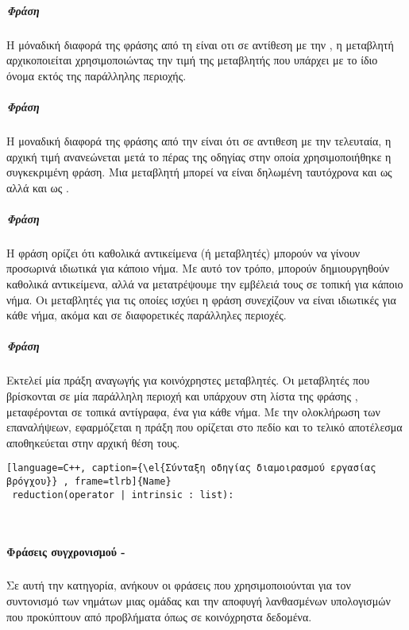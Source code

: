 \subparagraph{Φράση \emph{}}
\subparagraph{}
Η μόναδική διαφορά της φράσης \emph{} από τη \emph{} είναι οτι σε αντίθεση με την \emph{}, η μεταβλητή αρχικοποιείται χρησιμοποιώντας την τιμή της μεταβλητής που υπάρχει με το ίδιο όνομα εκτός της παράλληλης περιοχής.

\subparagraph{Φράση \emph{}}
\subparagraph{}
Η μοναδική διαφορά της φράσης \emph{} από την \emph{} είναι ότι σε αντιθεση με την τελευταία, η αρχική τιμή ανανεώνεται μετά το πέρας της οδηγίας στην οποία χρησιμοποιήθηκε η συγκεκριμένη φράση. Μια μεταβλητή μπορεί να είναι δηλωμένη ταυτόχρονα και ως \emph{} αλλά και ως \emph{}.

\clearpage
\subparagraph{Φράση \emph{}}
\subparagraph{}
Η φράση \emph{} ορίζει ότι καθολικά αντικείμενα (ή μεταβλητές) μπορούν να γίνουν προσωρινά ιδιωτικά για κάποιο νήμα. Με αυτό τον τρόπο, μπορούν δημιουργηθούν καθολικά αντικείμενα, αλλά να μετατρέψουμε την εμβέλειά τους σε τοπική για κάποιο νήμα. Οι μεταβλητές για τις οποίες ισχύει η φράση \emph{} συνεχίζουν να είναι ιδιωτικές για κάθε νήμα, ακόμα και σε διαφορετικές παράλληλες περιοχές\cite{pdplab}.

\subparagraph{Φράση \emph{}}
\subparagraph{}
Εκτελεί μία πράξη αναγωγής για κοινόχρηστες μεταβλητές. Οι μεταβλητές που βρίσκονται σε μία παράλληλη περιοχή και υπάρχουν στη λίστα της φράσης \emph{}, μεταφέρονται σε τοπικά αντίγραφα, ένα για κάθε νήμα. Με την ολοκλήρωση των επαναλήψεων, εφαρμόζεται η πράξη που ορίζεται στο πεδίο \emph{} και το τελικό αποτέλεσμα αποθηκεύεται στην αρχική θέση τους\cite{pdplab}.
\begin{lstlisting}[language=C++, caption={\el{Σύνταξη οδηγίας διαμοιρασμού εργασίας βρόγχου}} , frame=tlrb]{Name}
 reduction(operator | intrinsic : list):\end{lstlisting}

\ \\
\paragraph{Φράσεις συγχρονισμού - \emph{}}
\subparagraph{}
Σε αυτή την κατηγορία, ανήκουν οι φράσεις που χρησιμοποιούνται για τον συντονισμό των νημάτων μιας ομάδας και την αποφυγή λανθασμένων υπολογισμών που προκύπτουν από προβλήματα όπως \emph{} σε κοινόχρηστα δεδομένα.

